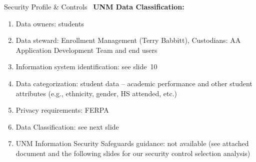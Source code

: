 \documentclass[t,handout]{beamer}   %
\begin{document}
\begin{frame}{Security Profile \& Controls~}%
\vspace*{-0.25in}
\textbf{UNM Data Classification:}
\begin{enumerate}
\item Data owners: students
\pause
\item Data steward: Enrollment Management (Terry Babbitt), Custodians: AA Application Development Team and end users
\pause
\item Information system identification: see slide~10
\pause
\item Data categorization: student data -- academic performance and other student attributes (e.g., ethnicity, gender, HS attended, etc.)
\pause
\item Privacy requirements: FERPA 
\pause
\item Data Classification: see next slide
\pause
\item UNM Information Security Safeguards guidance: not available (see attached document and the following slides for our security control selection analysis)
\end{enumerate}
\end{frame}
\end{document}
